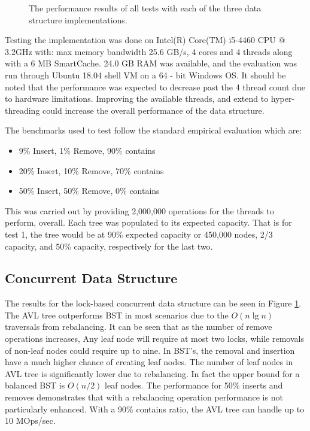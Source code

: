 \documentclass[conference]{IEEEtran}
\theoremstyle{definition}
\theoremstyle{theorem}
\begin{document}
\begin{figure}[t]
\begin{minipage}{0.33\textwidth}
\end{minipage}
\caption{The performance results of all tests with each of the three data structure implementations.}
\label{fig:data}
\end{figure}%
Testing the implementation was done on Intel(R) Core(TM) i5-4460 CPU @ 3.2GHz with: max memory bandwidth 25.6 GB/s, 4 cores and 4 threads along with a  6 MB SmartCache. 24.0 GB RAM was available, and the evaluation was run through Ubuntu 18.04 shell VM on a 64 - bit Windows OS. It should be noted that the performance was expected to decrease past the 4 thread count due to hardware limitations. Improving the available threads, and extend to hyper-threading could increase the overall performance of the data structure.

The benchmarks used to test follow the standard empirical evaluation which are:
\begin{itemize}
\item 9\% Insert, 1\% Remove, 90\% contains
\item 20\% Insert, 10\% Remove, 70\% contains
\item 50\% Insert, 50\% Remove, 0\% contains
\end{itemize}
This was carried out by providing 2,000,000 operations for the threads to perform, overall. Each tree was populated to its expected capacity. That is for test 1, the tree would be at 90\% expected capacity or 450,000 nodes, 2/3 capacity, and 50\% capacity, respectively for the last two.

\subsection{Concurrent Data Structure}
The results for the lock-based concurrent data structure can be seen in Figure  \ref{fig:data}. The AVL tree outperforms BST in most scenarios due to the $O(n\lg n)$ traversals from rebalancing. It can be seen that as the number of remove operations increases, Any leaf node will require at most two locks, while removals of non-leaf nodes could require up to nine. In BST's, the removal and insertion have a much higher chance of creating leaf nodes. The number of leaf nodes in AVL tree is significantly lower due to rebalancing. In fact the upper bound for a balanced BST is $O(n/2)$ leaf nodes. The performance for 50\% inserts and removes demonstrates that with a rebalancing operation performance is not particularly enhanced. With a 90\% contains ratio, the AVL tree can handle up to 10 MOps/sec.
\end{document}
